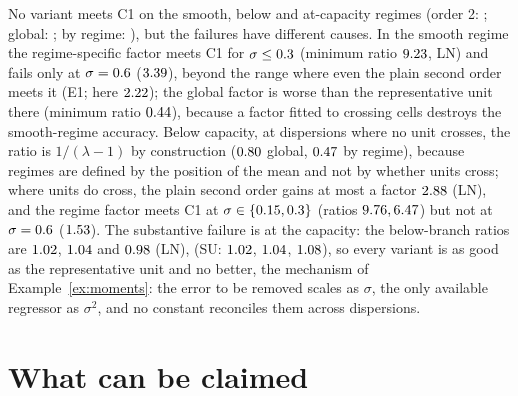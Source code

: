 \documentclass[10pt,a4paper]{article}
\theoremstyle{plain}
\theoremstyle{definition}
\theoremstyle{remark}
\begin{document}
No variant meets C1 on the smooth, below and at-capacity regimes (order 2: \EfiveOtwoConeExclAbove; global: \EfiveGlobConeExclAbove; by regime: \EfiveRegConeExclAbove), but the failures have different causes. In the smooth regime the regime-specific factor meets C1 for $\sigma\le0.3$ (minimum ratio $9.23$, LN) and fails only at $\sigma=0.6$ ($3.39$), beyond the range where even the plain second order meets it (E1; here $2.22$); the global factor is worse than the representative unit there (minimum ratio $0.44$), because a factor fitted to crossing cells destroys the smooth-regime accuracy. Below capacity, at dispersions where no unit crosses, the ratio is $1/(\lambda-1)$ by construction ($0.80$ global, $0.47$ by regime), because regimes are defined by the position of the mean and not by whether units cross; where units do cross, the plain second order gains at most a factor $2.88$ (LN), and the regime factor meets C1 at $\sigma\in\{0.15, 0.3\}$ (ratios $9.76, 6.47$) but not at $\sigma=0.6$ ($1.53$). The substantive failure is at the capacity: the below-branch ratios are $1.02$, $1.04$ and $0.98$ (LN), (SU: $1.02$, $1.04$, $1.08$), so every variant is as good as the representative unit and no better, the mechanism of Example~\ref{ex:moments}: the error to be removed scales as $\sigma$, the only available regressor as $\sigma^2$, and no constant reconciles them across dispersions.

\section{What can be claimed}\label{sec:claims}
\end{document}

